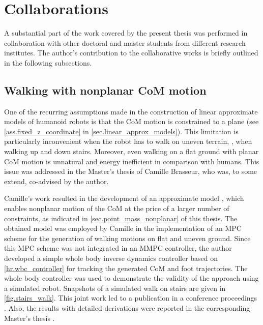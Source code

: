 \section{Collaborations}\label{sec.collaboration_results}

A substantial part of the work covered by the present thesis was performed in
collaboration with other doctoral and master students from different research
institutes. The author's contribution to the collaborative works is briefly
outlined in the following subsections.


\subsection{Walking with nonplanar CoM motion}\label{sec.3d_walk}

One of the recurring assumptions made in the construction of linear approximate
models of humanoid robots is that the \ac{CoM} motion is constrained to a plane
(see \cref{ass.fixed_z_coordinate} in \cref{sec.linear_approx_models}). This
limitation is particularly inconvenient when the robot has to walk on uneven
terrain, \IE, when walking up and down stairs. Moreover, even walking on a flat
ground with planar \ac{CoM} motion is unnatural and energy inefficient in
comparison with humans. This issue was addressed in the Master's thesis of
Camille Brasseur, who was, to some extend, co-advised by the author.


Camille's work resulted in the development of an approximate model
\cite{Brasseur2015thesis}, which enables nonplanar motion of the \ac{CoM} at
the price of a larger number of constraints, as indicated in
\cref{sec.point_mass_nonplanar} of this thesis. The obtained model was employed
by Camille in the implementation of an \ac{MPC} scheme for the generation of
walking motions on flat and uneven ground. Since this \ac{MPC} scheme was not
integrated in an \ac{MMPC} controller, the author developed a simple whole body
inverse dynamics controller based on \cref{hr.wbc_controller} for tracking the
generated \ac{CoM} and foot trajectories. The whole body controller was used to
demonstrate the validity of the approach using a simulated  robot.
Snapshots of a simulated walk on stairs are given in \cref{fig.stairs_walk}.
This joint work led to a publication in a conference proceedings
\cite{Brasseur2015humanoids}. Also, the results with detailed derivations were
reported in the corresponding Master's thesis \cite{Brasseur2015thesis}.


